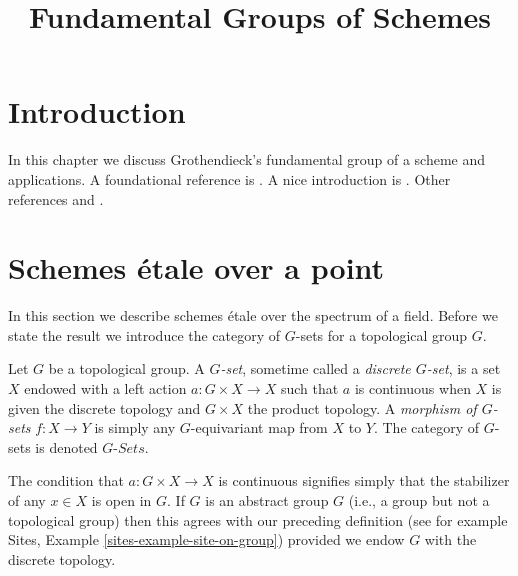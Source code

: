 

%


\title{Fundamental Groups of Schemes}


\maketitle

\label{section-phantom}

\tableofcontents

\section{Introduction}
\label{section-introduction}

\noindent
In this chapter we discuss Grothendieck's fundamental group of a scheme
and applications. A foundational reference is \cite{SGA1}.
A nice introduction is \cite{Lenstra}.
Other references \cite{Murre-lectures} and \cite{Grothendieck-Murre}.










\section{Schemes \'etale over a point}
\label{section-schemes-etale-point}

\noindent
In this section we describe schemes \'etale over the spectrum of a field.
Before we state the result we introduce the category of $G$-sets for a
topological group $G$.

\begin{definition}
\label{definition-G-set-continuous}
Let $G$ be a topological group.
A {\it $G$-set}, sometime called a {\it discrete $G$-set},
is a set $X$ endowed with a left action $a : G \times X \to X$
such that $a$ is continuous when $X$ is given the discrete topology and
$G \times X$ the product topology.
A {\it morphism of $G$-sets} $f : X \to Y$ is simply any $G$-equivariant
map from $X$ to $Y$.
The category of $G$-sets is denoted {\it $G\textit{-Sets}$}.
\end{definition}

\noindent
The condition that $a : G \times X \to X$ is continuous signifies
simply that the stabilizer of any  $x \in X$ is open in $G$.
If $G$ is an abstract group $G$ (i.e., a group but not a topological group)
then this agrees with our preceding definition (see for example
Sites, Example \ref{sites-example-site-on-group})
provided we endow $G$ with the discrete topology.

